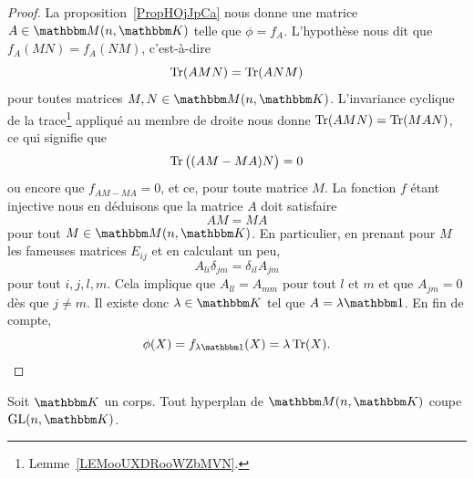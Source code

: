 \begin{proof}
    La proposition~\ref{PropHOjJpCa} nous donne une matrice \( A\in \eM(n,\eK)\) telle que \( \phi=f_A\). L'hypothèse nous dit que \( f_A(MN)=f_A(NM)\), c'est-à-dire
    \begin{equation}
        \operatorname{Tr}(AMN)=\operatorname{Tr}(ANM)
    \end{equation}
    pour toutes matrices \( M, N\in \eM(n,\eK)\). L'invariance cyclique de la trace\footnote{Lemme~\ref{LEMooUXDRooWZbMVN}.} appliqué au membre de droite nous donne \( \operatorname{Tr}(AMN)=\operatorname{Tr}(MAN)\), ce qui signifie que
    \begin{equation}
        \operatorname{Tr}\big( (AM-MA)N \big)=0
    \end{equation}
    ou encore que \( f_{AM-MA}=0\), et ce, pour toute matrice \( M\). La fonction \( f\) étant injective nous en déduisons que la matrice \( A\) doit satisfaire
    \begin{equation}
        AM=MA
    \end{equation}
    pour tout \( M\in\eM(n,\eK)\). En particulier, en prenant pour \( M \) les fameuses matrices \( E_{ij}\) et en calculant un peu,
    \begin{equation}
        A_{li}\delta_{jm}=\delta_{il}A_{jm}
    \end{equation}
    pour tout \( i,j,l,m\). Cela implique que \( A_{ll}=A_{mm}\) pour tout \( l\) et \( m\) et que \( A_{jm}=0\) dès que \( j\neq m\). Il existe donc \( \lambda\in \eK\) tel que \( A=\lambda\mtu\). En fin de compte,
    \begin{equation}
        \phi(X)=f_{\lambda\mtu}(X)=\lambda\Tr(X).
    \end{equation}
\end{proof}

\begin{corollary}       \label{CorICUOooPsZQrg}
    Soit \( \eK\) un corps. Tout hyperplan de \( \eM(n,\eK)\) coupe \( \GL(n,\eK)\).
\end{corollary}

